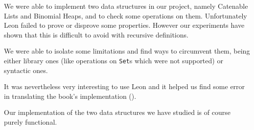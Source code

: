 We were able to implement two data structures in our project,
namely Catenable Lists and Binomial Heaps,
and to check some operations on them.
Unfortunately Leon failed to prove or disprove some properties. 
However our experiments have shown 
that this is difficult to avoid with recursive definitions.

We were able to isolate some limitations and find ways to circumvent them, 
being either library ones (like operations on \texttt{Set}s which were not supported) 
or syntactic ones.

It was nevertheless very interesting to use Leon and it helped us find some error 
in translating the book's implementation (\citep{Okasaki}). 

Our implementation of the two data structures we have studied is of course purely functional.